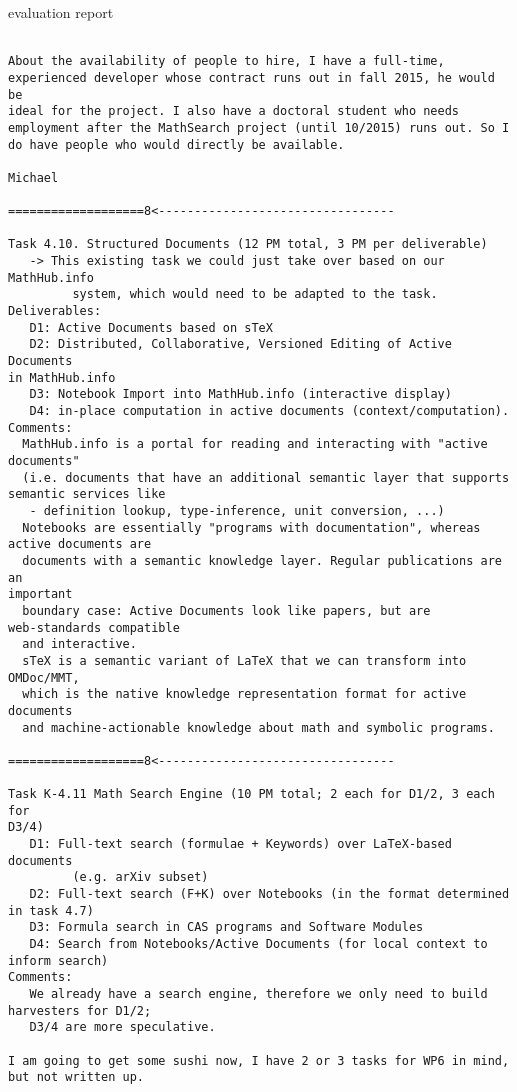 \begin{workpackage}[id=UI,wphases=24-48,
  title=User Interfaces,
  PSRM=1,
  JURM=12, %
  LLRM=1, %
  SARM=1, %
  UKRM=1, %
  UBRM=1, %
  USORM=25]
\begin{wpdelivs}
  \begin{wpdeliv}[due=48,id=del:oommf-nb-evaluation,dissem=??,nature=??]
      {\OOMMFNB{} evaluation report}
\end{wpdeliv}
\end{wpdelivs}
\end{workpackage}

\begin{verbatim}

About the availability of people to hire, I have a full-time,
experienced developer whose contract runs out in fall 2015, he would be
ideal for the project. I also have a doctoral student who needs
employment after the MathSearch project (until 10/2015) runs out. So I
do have people who would directly be available.

Michael

===================8<---------------------------------

Task 4.10. Structured Documents (12 PM total, 3 PM per deliverable)
   -> This existing task we could just take over based on our MathHub.info
         system, which would need to be adapted to the task.
Deliverables:
   D1: Active Documents based on sTeX
   D2: Distributed, Collaborative, Versioned Editing of Active Documents
in MathHub.info
   D3: Notebook Import into MathHub.info (interactive display)
   D4: in-place computation in active documents (context/computation).
Comments:
  MathHub.info is a portal for reading and interacting with "active
documents"
  (i.e. documents that have an additional semantic layer that supports
semantic services like
   - definition lookup, type-inference, unit conversion, ...)
  Notebooks are essentially "programs with documentation", whereas
active documents are
  documents with a semantic knowledge layer. Regular publications are an
important
  boundary case: Active Documents look like papers, but are
web-standards compatible
  and interactive.
  sTeX is a semantic variant of LaTeX that we can transform into OMDoc/MMT,
  which is the native knowledge representation format for active documents
  and machine-actionable knowledge about math and symbolic programs.

===================8<---------------------------------

Task K-4.11 Math Search Engine (10 PM total; 2 each for D1/2, 3 each for
D3/4)
   D1: Full-text search (formulae + Keywords) over LaTeX-based documents
         (e.g. arXiv subset)
   D2: Full-text search (F+K) over Notebooks (in the format determined
in task 4.7)
   D3: Formula search in CAS programs and Software Modules
   D4: Search from Notebooks/Active Documents (for local context to
inform search)
Comments:
   We already have a search engine, therefore we only need to build
harvesters for D1/2;
   D3/4 are more speculative.

I am going to get some sushi now, I have 2 or 3 tasks for WP6 in mind,
but not written up.

\end{verbatim}

